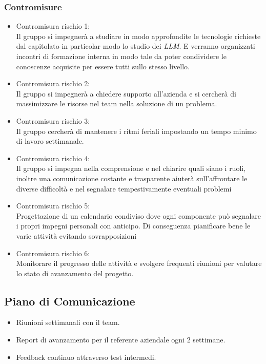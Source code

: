 \documentclass{article}
\begin{document}
        \subsubsection{Contromisure}
        \begin{itemize}
            \item{Contromisura rischio 1:\\}
            Il gruppo si impegnerà a studiare in modo approfondite le tecnologie richieste dal capitolato in particolar modo lo studio dei \emph{LLM}. E verranno organizzati incontri di formazione interna in modo tale da poter condividere le conoscenze acquisite per essere tutti sullo stesso livello.
            \item{Contromisura rischio 2:\\}
            Il gruppo si impegnerà a chiedere supporto all'azienda e si cercherà di massimizzare le risorse nel team nella soluzione di un problema.
            \item{Contromisura rischio 3:\\}
            Il gruppo cercherà di mantenere i ritmi feriali impostando un tempo minimo di lavoro settimanale.
            \item{Contromisura rischio 4:\\}
            Il gruppo si impegna nella comprensione e nel chiarire quali siano i ruoli, inoltre una comunicazione costante e trasparente aiuterà sull'affrontare le diverse difficoltà e nel segnalare tempestivamente eventuali problemi
            \item{Contromisura rischio 5:\\}
            Progettazione di un calendario condiviso dove ogni componente può segnalare i propri impegni personali con anticipo. Di conseguenza pianificare bene le varie attività evitando sovrapposizioni
            \item{Contromisura rischio 6:\\}
            Monitorare il progresso delle attività e svolgere frequenti riunioni per valutare lo stato di avanzamento del progetto.
        \end{itemize}

    \subsection{Piano di Comunicazione}
    \begin{itemize}
        \item Riunioni settimanali con il team.
        \item Report di avanzamento per il referente aziendale ogni 2 settimane.
        \item Feedback continuo attraverso test intermedi.
    \end{itemize}
\end{document}
